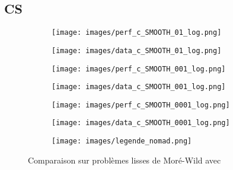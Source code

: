 	\subsection{CS}
	\begin{figure}[!htb] %
		\centering
		\begin{subfigure}{0.43\textwidth}
			\texttt{[image: images/perf\_c\_SMOOTH\_01\_log.png]}
		\end{subfigure}%
		\begin{subfigure}{0.43\textwidth}
			\texttt{[image: images/data\_c\_SMOOTH\_01\_log.png]}
		\end{subfigure}
		\smallskip
		\begin{subfigure}{0.43\textwidth}
			\texttt{[image: images/perf\_c\_SMOOTH\_001\_log.png]}
		\end{subfigure}%
		\begin{subfigure}{0.43\textwidth}
			\texttt{[image: images/data\_c\_SMOOTH\_001\_log.png]}
		\end{subfigure}
		\smallskip
		\begin{subfigure}{0.43\textwidth}
			\texttt{[image: images/perf\_c\_SMOOTH\_0001\_log.png]}
		\end{subfigure}%
		\begin{subfigure}{0.43\textwidth}
			\texttt{[image: images/data\_c\_SMOOTH\_0001\_log.png]}
		\end{subfigure}
		\smallskip
		\begin{subfigure}{0.95\textwidth}
			\texttt{[image: images/legende\_nomad.png]}
		\end{subfigure}
		\caption{Comparaison sur problèmes lisses de Moré-Wild avec \CS} \label{fig:1}
	\end{figure}
	\clearpage
